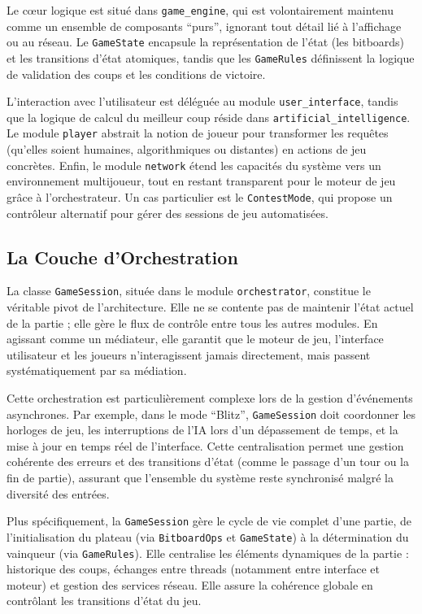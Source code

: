 \documentclass[a4paper]{article}
\begin{document}
Le cœur logique est situé dans \texttt{game\_engine}, qui est volontairement maintenu comme un ensemble de composants ``purs'', ignorant tout détail lié à l'affichage ou au réseau. Le \texttt{GameState} encapsule la représentation de l'état (les bitboards) et les transitions d'état atomiques, tandis que les \texttt{GameRules} définissent la logique de validation des coups et les conditions de victoire.

L'interaction avec l'utilisateur est déléguée au module \texttt{user\_interface}, tandis que la logique de calcul du meilleur coup réside dans \texttt{artificial\_intelligence}. Le module \texttt{player} abstrait la notion de joueur pour transformer les requêtes (qu'elles soient humaines, algorithmiques ou distantes) en actions de jeu concrètes. Enfin, le module \texttt{network} étend les capacités du système vers un environnement multijoueur, tout en restant transparent pour le moteur de jeu grâce à l'orchestrateur. Un cas particulier est le \texttt{ContestMode}, qui propose un contrôleur alternatif pour gérer des sessions de jeu automatisées.

\subsection{La Couche d'Orchestration}

La classe \texttt{GameSession}, située dans le module \texttt{orchestrator}, constitue le véritable pivot de l'architecture. Elle ne se contente pas de maintenir l'état actuel de la partie ; elle gère le flux de contrôle entre tous les autres modules. En agissant comme un médiateur, elle garantit que le moteur de jeu, l'interface utilisateur et les joueurs n'interagissent jamais directement, mais passent systématiquement par sa médiation.

Cette orchestration est particulièrement complexe lors de la gestion d'événements asynchrones. Par exemple, dans le mode ``Blitz'', \texttt{GameSession} doit coordonner les horloges de jeu, les interruptions de l'IA lors d'un dépassement de temps, et la mise à jour en temps réel de l'interface. Cette centralisation permet une gestion cohérente des erreurs et des transitions d'état (comme le passage d'un tour ou la fin de partie), assurant que l'ensemble du système reste synchronisé malgré la diversité des entrées.

Plus spécifiquement, la \texttt{GameSession} gère le cycle de vie complet d'une partie, de l'initialisation du plateau (via \texttt{BitboardOps} et \texttt{GameState}) à la détermination du vainqueur (via \texttt{GameRules}). Elle centralise les éléments dynamiques de la partie : historique des coups, échanges entre threads (notamment entre interface et moteur) et gestion des services réseau. Elle assure la cohérence globale en contrôlant les transitions d’état du jeu.
\end{document}
